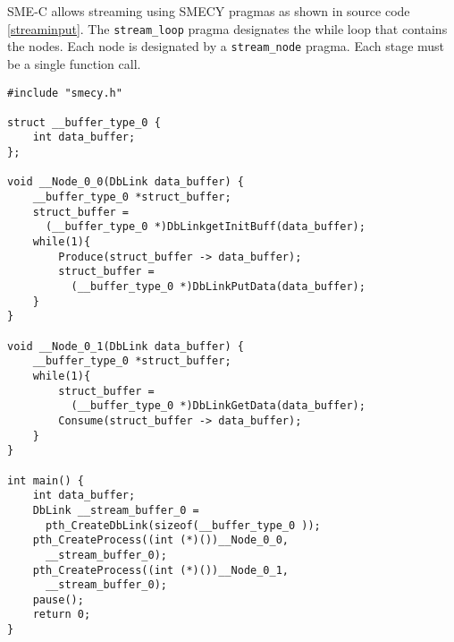 \documentclass [A4]{article}
\begin{document}
	SME-C allows streaming using SMECY pragmas as shown in source code \ref{streaminput}. The \verb+stream_loop+ pragma designates the while loop that contains the nodes. Each node is designated by a \verb+stream_node+ pragma. Each stage must be a single function call.
	
	\begin{lstlisting}[label=streamoutput,caption={Possible output code. Definitions of functions \texttt{Produce} and \texttt{Consume} are not shown.}]
#include "smecy.h" 

struct __buffer_type_0 {
	int data_buffer;
};

void __Node_0_0(DbLink data_buffer) {
	__buffer_type_0 *struct_buffer;
	struct_buffer =
	  (__buffer_type_0 *)DbLinkgetInitBuff(data_buffer);
	while(1){
		Produce(struct_buffer -> data_buffer);
		struct_buffer = 
		  (__buffer_type_0 *)DbLinkPutData(data_buffer);
	}
}

void __Node_0_1(DbLink data_buffer) {
	__buffer_type_0 *struct_buffer;
	while(1){
		struct_buffer = 
		  (__buffer_type_0 *)DbLinkGetData(data_buffer);
		Consume(struct_buffer -> data_buffer);
	}
}

int main() {
	int data_buffer;
	DbLink __stream_buffer_0 = 
	  pth_CreateDbLink(sizeof(__buffer_type_0 ));
	pth_CreateProcess((int (*)())__Node_0_0,
	  __stream_buffer_0);
	pth_CreateProcess((int (*)())__Node_0_1,
	  __stream_buffer_0);
	pause();
	return 0;
}
	\end{lstlisting}
	
\end{document}
